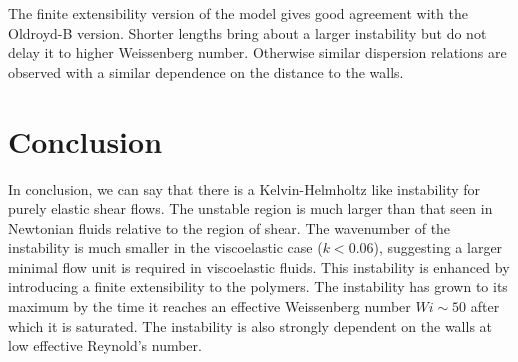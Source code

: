 \documentclass{article}
\begin{document}
The finite extensibility version of the model gives good agreement with the Oldroyd-B version. Shorter lengths bring about a larger instability but do not delay it to higher Weissenberg number. Otherwise similar dispersion relations are observed with a similar dependence on the distance to the walls.

\section{Conclusion}

In conclusion, we can say that there is a Kelvin-Helmholtz like instability for purely elastic shear flows. The unstable region is much larger than that seen in Newtonian fluids relative to the region of shear. The wavenumber of the instability is much smaller in the viscoelastic case ($k<0.06$), suggesting a larger minimal flow unit is required in viscoelastic fluids. This instability is enhanced by introducing a finite extensibility to the polymers. The instability has grown to its maximum by the time it reaches an effective Weissenberg number $ Wi \sim 50$ after which it is saturated. The instability is also strongly dependent on the walls at low effective Reynold's number.
\end{document}
